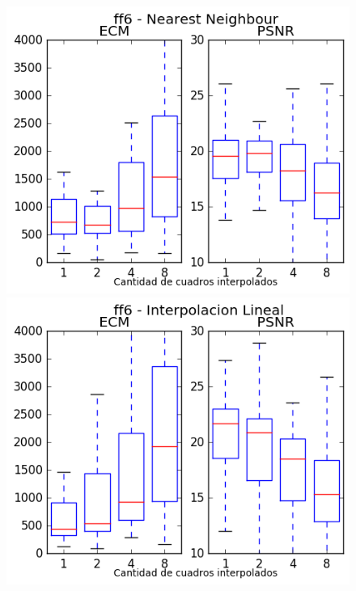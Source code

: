\begin{figure}[H]
\centering
\begin{minipage}{0.35\textwidth}
    \includegraphics[width=1\textwidth]{imgs/resultados_error/ff6_0.png}
\end{minipage}%
\begin{minipage}{0.35\textwidth}   
    \includegraphics[width=1\textwidth]{imgs/resultados_error/ff6_1.png} 
\end{minipage}
\end{figure}
